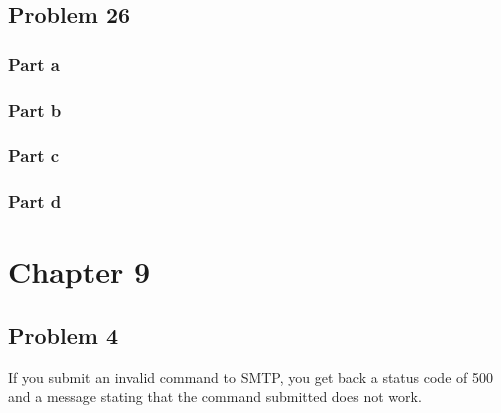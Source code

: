 \documentclass{article}%
\begin{document}
\subsection*{Problem 26}

\subsubsection*{Part a}
\subsubsection*{Part b}
\subsubsection*{Part c}
\subsubsection*{Part d}


\section*{Chapter 9}
\subsection*{Problem 4}
If you submit an invalid command to SMTP, you get back a status code of 500 and a message
stating that the command submitted does not work.
\end{document}
